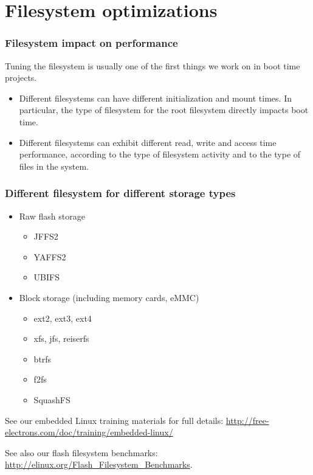 \section{Filesystem optimizations}

\begin{frame}
\frametitle{Filesystem impact on performance}
Tuning the filesystem is usually one of the first things
we work on in boot time projects.
\begin{itemize}
\item Different filesystems can have different initialization
      and mount times. In particular, the type of filesystem
      for the root filesystem directly impacts boot time.
\item Different filesystems can exhibit different read, write
      and access time performance, according to the type 
      of filesystem activity and to the type of files in the
      system. 
\end{itemize}
\end{frame}

\begin{frame}
\frametitle{Different filesystem for different storage types}
\begin{itemize}
\item Raw flash storage
      \begin{itemize}
      \item JFFS2
      \item YAFFS2
      \item UBIFS
      \end{itemize}
\item Block storage (including memory cards, eMMC)
      \begin{itemize}
      \item ext2, ext3, ext4
      \item xfs, jfs, reiserfs 
      \item btrfs
      \item f2fs
      \item SquashFS
      \end{itemize}
\end{itemize}
See our embedded Linux training materials for full details:
{\small
\url{http://free-electrons.com/doc/training/embedded-linux/}
}

See also our flash filesystem benchmarks:
{\small
\url{http://elinux.org/Flash_Filesystem_Benchmarks}.
}
\end{frame}

